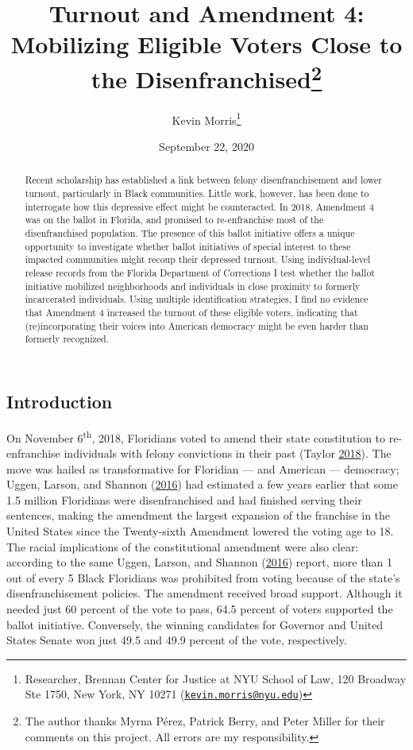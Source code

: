 \documentclass[
  12pt,
]{article}
\title{Turnout and Amendment 4: Mobilizing Eligible Voters Close to the Disenfranchised\thanks{The author thanks Myrna Pérez, Patrick Berry, and Peter Miller for their comments on this project. All errors are my responsibility.}}
\author{Kevin Morris\footnote{Researcher, Brennan Center for Justice at NYU School of Law, 120 Broadway Ste 1750, New York, NY 10271 (\href{mailto:kevin.morris@nyu.edu}{\nolinkurl{kevin.morris@nyu.edu}})}}
\date{September 22, 2020}
\begin{document}
\maketitle
\begin{abstract}
Recent scholarship has established a link between felony disenfranchisement and lower turnout, particularly in Black communities. Little work, however, has been done to interrogate how this depressive effect might be counteracted. In 2018, Amendment 4 was on the ballot in Florida, and promised to re-enfranchise most of the disenfranchised population. The presence of this ballot initiative offers a unique opportunity to investigate whether ballot initiatives of special interest to these impacted communities might recoup their depressed turnout. Using individual-level release records from the Florida Department of Corrections I test whether the ballot initiative mobilized neighborhoods and individuals in close proximity to formerly incarcerated individuals. Using multiple identification strategies, I find no evidence that Amendment 4 increased the turnout of these eligible voters, indicating that (re)incorporating their voices into American democracy might be even harder than formerly recognized.
\end{abstract}

\pagebreak

\doublespacing

\hypertarget{introduction}{%
\subsection*{Introduction}\label{introduction}}

On November 6\textsuperscript{th}, 2018, Floridians voted to amend their state constitution to re-enfranchise individuals with felony convictions in their past (Taylor \protect\hyperlink{ref-Taylor2018}{2018}). The move was hailed as transformative for Floridian --- and American --- democracy; Uggen, Larson, and Shannon (\protect\hyperlink{ref-sentencing_2016}{2016}) had estimated a few years earlier that some 1.5 million Floridians were disenfranchised and had finished serving their sentences, making the amendment the largest expansion of the franchise in the United States since the Twenty-sixth Amendment lowered the voting age to 18. The racial implications of the constitutional amendment were also clear: according to the same Uggen, Larson, and Shannon (\protect\hyperlink{ref-sentencing_2016}{2016}) report, more than 1 out of every 5 Black Floridians was prohibited from voting because of the state's disenfranchisement policies. The amendment received broad support. Although it needed just 60 percent of the vote to pass, 64.5 percent of voters supported the ballot initiative. Conversely, the winning candidates for Governor and United States Senate won just 49.5 and 49.9 percent of the vote, respectively.
\end{document}
